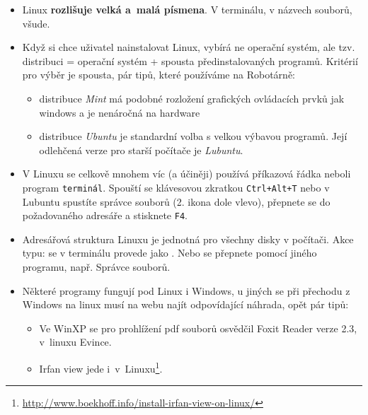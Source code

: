 \begin{itemize}

\item Linux {\bf rozlišuje velká a~malá písmena}. V terminálu, v názvech souborů, všude. 

\item Když si chce uživatel nainstalovat Linux, vybírá ne operační systém, ale tzv. distribuci = operační systém + spousta předinstalovaných programů. Kritérií pro výběr je spousta, pár tipů, které používáme na Robotárně: 

	\begin{itemize}
		\item distribuce {\it Mint} má podobné rozložení grafických ovládacích prvků jak windows a je nenáročná na hardware 
	
		\item distribuce {\it Ubuntu} je standardní volba s velkou výbavou programů. Její odlehčená verze pro starší počítače je {\it Lubuntu}. 
	
	\end{itemize}  

\item V Linuxu se celkově mnohem víc (a účiněji) používá příkazová řádka neboli program  {\tt terminál}.  Spouští se klávesovou zkratkou {\tt Ctrl+Alt+T} nebo v Lubuntu spustíte správce souborů (2. ikona dole vlevo), přepnete se do požadovaného adresáře a stisknete {\tt F4}. \label{terminal}

\item Adresářová struktura Linuxu je jednotná pro všechny disky v počítači. Akce typu: {\it {} } se v terminálu provede jako {\it {} }. Nebo se přepnete pomocí jiného programu, např. Správce souborů. 	
	
\item Některé programy fungují pod Linux i Windows, u jiných se při přechodu z Windows na linux musí na webu najít odpovídající náhrada, opět pár tipů: 

	\begin{itemize}
		\item Ve WinXP se pro prohlížení pdf souborů osvědčil Foxit Reader verze 2.3, v~linuxu Evince.  
			
		\item Irfan view jede i~v~Linuxu\footnote{\url{http://www.boekhoff.info/install-irfan-view-on-linux/}}.
	
	\end{itemize}

	
\end{itemize}


